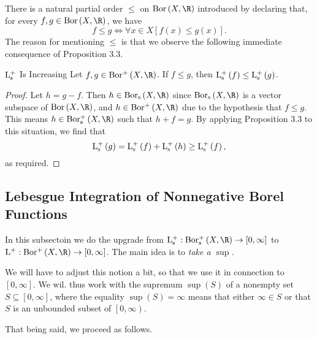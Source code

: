 \documentclass[pmath450]{subfiles}
\begin{document}
    \np There is a natural partial order $\leq$ on $\bor\left( X,\R \right)$ introduced by declaring that, for every $f,g\in\bor\left( X,\R \right)$, we have
    \begin{equation*}
        f\leq g \iff \forall x\in X\left[ f\left( x \right)\leq g\left( x \right) \right].
    \end{equation*}
    The reason for mentioning $\leq$ is that we observe the following immediate consequence of Proposition 3.3.

    \begin{cor}{$\operatorname{L^+_s}$ Is Increasing}
        Let $f,g\in\borplus\left( X,\R \right)$. If $f\leq g$, then $\operatorname{L^+_s}\left( f \right)\leq\operatorname{L^+_s}\left( g \right)$.
    \end{cor}	

    \begin{proof}
        Let $h=g-f$. Then $h\in\bors\left( X,\R \right)$ since $\bors\left( X,\R \right)$ is a vector subspace of $\bor\left( X,\R \right)$, and $h\in\borplus\left( X,\R \right)$ due to the hypothesis that $f\leq g$. This means $h\in\borpluss\left( X,\R \right)$ such that $h+f=g$. By applying Proposition 3.3 to this situation, we find that
        \begin{equation*}
            \operatorname{L^+_s}\left( g \right)=\operatorname{L^+_s}\left( f \right)+\operatorname{L^+_s}\left( h \right)\geq\operatorname{L^+_s}\left( f \right),
        \end{equation*}
        as required.
    \end{proof}

    \subsection{Lebesgue Integration of Nonnegative Borel Functions}
    
    In this subsectoin we do the upgrade from $\lpluss:\borpluss\left( X,\R \right)\to\left[ 0,\infty \right]$ to $\lplus:\borplus\left( X,\R \right)\to\left[ 0,\infty \right]$. The main idea is to \textit{take a $\sup$.}

    We will have to adjust this notion a bit, so that we use it in connection to $\left[ 0,\infty \right]$. We wil. thus work with the supremum $\sup\left( S \right)$ of a nonempty set $S\subseteq\left[ 0,\infty \right]$, where the equality $\sup\left( S \right)=\infty$ means that either $\infty\in S$ or that $S$ is an unbounded subset of $\left[ 0,\infty \right)$.

    That being said, we proceed as follows.
\end{document}
